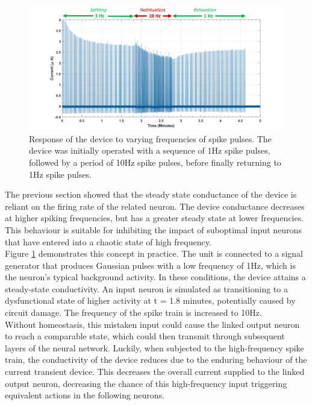 \begin{figure}[htbp!] 
\centering    
\includegraphics[width=1\textwidth]{Chapter4/Figs/l.png}
\caption[Response of the device to different frequency of spike pulses]{Response of the device to varying frequencies of spike pulses. The device was initially operated with a sequence of 1Hz spike pulses, followed by a period of 10Hz spike pulses, before finally returning to 1Hz spike pulses.}
\label{fig:4l}
\end{figure}


\noindent The previous section showed that the steady state conductance of the device is reliant on the firing rate of the related neuron. The device conductance decreases at higher spiking frequencies, but has a greater steady state at lower frequencies. This behaviour is suitable for inhibiting the impact of suboptimal input neurons that have entered into a chaotic state of high frequency.\\

\noindent Figure \ref{fig:4l} demonstrates this concept in practice. The unit is connected to a signal generator that produces Gaussian pulses with a low frequency of 1Hz, which is the neuron's typical background activity. In these conditions, the device attains a steady-state conductivity. An input neuron is simulated as transitioning to a dysfunctional state of higher activity at t = 1.8 minutes, potentially caused by circuit damage. The frequency of the spike train is increased to 10Hz. \\

\noindent Without homeostasis, this mistaken input could cause the linked output neuron to reach a comparable state, which could then transmit through subsequent layers of the neural network. Luckily, when subjected to the high-frequency spike train, the conductivity of the device reduces due to the enduring behaviour of the current transient device. This decreases the overall current supplied to the linked output neuron, decreasing the chance of this high-frequency input triggering equivalent actions in the following neurons.\\

